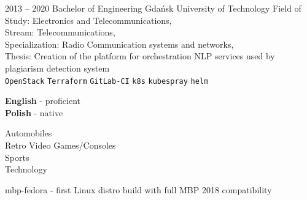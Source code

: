 \documentclass[9pt]{style/developercv}
\begin{document}


\begin{entrylist}
	\entry
		{2013 -- 2020}
    {Bachelor of Engineering}
    {Gdańsk University of Technology}
    {
      Field of Study: Electronics and Telecommunications, \\
      Stream: Telecommunications,\\
      Specialization: Radio Communication systems and networks,\\
      Thesis: Creation of the platform for orchestration NLP services used by plagiarism detection system\\

      \texttt{OpenStack}\slashsep
      \texttt{Terraform}\slashsep
      \texttt{GitLab-CI}\slashsep
			\texttt{k8s}\slashsep
			\texttt{kubespray}\slashsep
			\texttt{helm}\\
    }
		{}
\end{entrylist}


\begin{minipage}[t]{0.3\textwidth}
	\vspace{-\baselineskip}


	\textbf{English} - proficient\\
	\textbf{Polish} - native
\end{minipage}
\hfill
\begin{minipage}[t]{0.3\textwidth}
	\vspace{-\baselineskip}


  Automobiles\\
  Retro Video Games/Consoles\\
  Sports\\
  Technology
\end{minipage}
\hfill
\begin{minipage}[t]{0.3\textwidth}
	\vspace{-\baselineskip}


  mbp-fedora - first Linux distro build with full MBP 2018 compatibility
\end{minipage}
\end{document}
